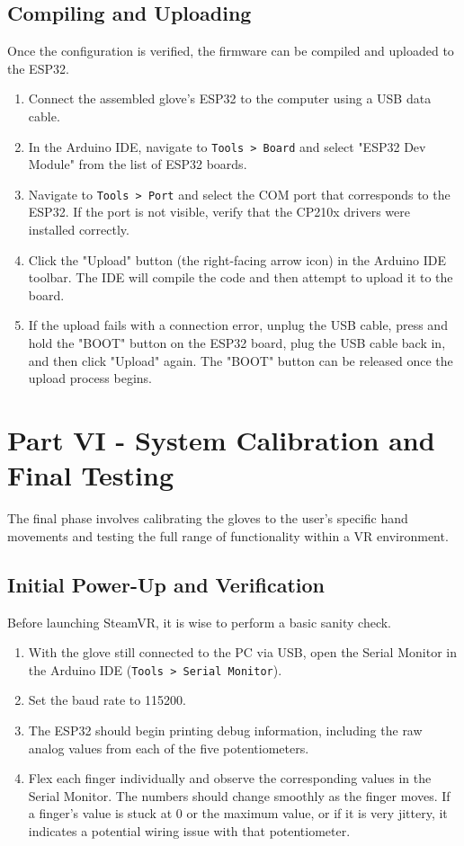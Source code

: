 \documentclass{article}
\begin{document}
\subsection{Compiling and Uploading}
Once the configuration is verified, the firmware can be compiled and uploaded to the ESP32.
\begin{enumerate}
    \item Connect the assembled glove's ESP32 to the computer using a USB data cable.
    \item In the Arduino IDE, navigate to \texttt{Tools > Board} and select "ESP32 Dev Module" from the list of ESP32 boards.
    \item Navigate to \texttt{Tools > Port} and select the COM port that corresponds to the ESP32. If the port is not visible, verify that the CP210x drivers were installed correctly.
    \item Click the "Upload" button (the right-facing arrow icon) in the Arduino IDE toolbar. The IDE will compile the code and then attempt to upload it to the board.
    \item If the upload fails with a connection error, unplug the USB cable, press and hold the "BOOT" button on the ESP32 board, plug the USB cable back in, and then click "Upload" again. The "BOOT" button can be released once the upload process begins.
\end{enumerate}

\newpage
\section{Part VI - System Calibration and Final Testing}
The final phase involves calibrating the gloves to the user's specific hand movements and testing the full range of functionality within a VR environment.

\subsection{Initial Power-Up and Verification}
Before launching SteamVR, it is wise to perform a basic sanity check.
\begin{enumerate}
    \item With the glove still connected to the PC via USB, open the Serial Monitor in the Arduino IDE (\texttt{Tools > Serial Monitor}).
    \item Set the baud rate to 115200.
    \item The ESP32 should begin printing debug information, including the raw analog values from each of the five potentiometers.
    \item Flex each finger individually and observe the corresponding values in the Serial Monitor. The numbers should change smoothly as the finger moves. If a finger's value is stuck at 0 or the maximum value, or if it is very jittery, it indicates a potential wiring issue with that potentiometer.
\end{enumerate}
\end{document}
